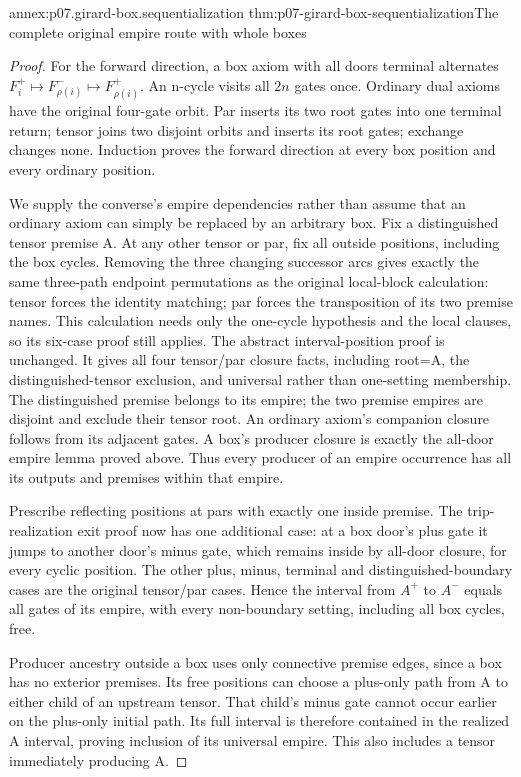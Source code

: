 \begin{annexitem}{annex:p07.girard-box.sequentialization}
 {thm:p07-girard-box-sequentialization}{The complete original empire route with whole boxes}
\begin{proof}
For the forward direction, a box axiom with all doors terminal alternates
\(F_i^+\mapsto F_{\rho(i)}^-\mapsto F_{\rho(i)}^+\).
An n-cycle visits all \(2n\) gates once. Ordinary dual axioms have the
original four-gate orbit. Par inserts its two root gates into one
terminal return; tensor joins two disjoint orbits and inserts its root
gates; exchange changes none. Induction proves the forward direction
at every box position and every ordinary position.

We supply the converse's empire dependencies rather than assume that
an ordinary axiom can simply be replaced by an arbitrary box.
Fix a distinguished tensor premise A. At any other tensor or par,
fix all outside positions, including the box cycles. Removing the
three changing successor arcs gives exactly the same three-path
endpoint permutations as the original local-block calculation:
tensor forces the identity matching; par forces the transposition
of its two premise names. This calculation needs only the one-cycle
hypothesis and the local clauses, so its six-case proof still applies.
The abstract interval-position proof is unchanged. It gives all four
tensor/par closure facts, including root=A, the distinguished-tensor
exclusion, and universal rather than one-setting membership.
The distinguished premise belongs to its empire; the two premise
empires are disjoint and exclude their tensor root.
An ordinary axiom's companion closure follows from its adjacent gates.
A box's producer closure is exactly the all-door empire lemma proved
above. Thus every producer of an empire occurrence has all its outputs
and premises within that empire.

Prescribe reflecting positions at pars with exactly one inside premise.
The trip-realization exit proof now has one additional case:
at a box door's plus gate it jumps to another door's minus gate,
which remains inside by all-door closure, for every cyclic position.
The other plus, minus, terminal and distinguished-boundary cases are
the original tensor/par cases. Hence the interval from \(A^+\) to
\(A^-\) equals all gates of its empire, with every non-boundary setting,
including all box cycles, free.

Producer ancestry outside a box uses only connective premise edges,
since a box has no exterior premises. Its free positions can choose
a plus-only path from A to either child of an upstream tensor.
That child's minus gate cannot occur earlier on the plus-only initial
path. Its full interval is therefore contained in the realized A
interval, proving inclusion of its universal empire. This also includes
a tensor immediately producing A.


\end{proof}
\end{annexitem}
